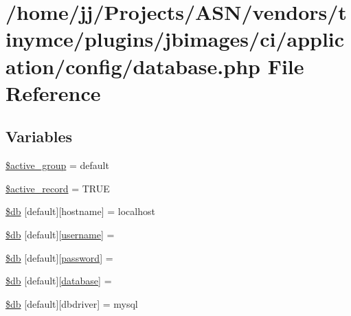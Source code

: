 \hypertarget{database_8php}{}\section{/home/jj/\+Projects/\+A\+S\+N/vendors/tinymce/plugins/jbimages/ci/application/config/database.php File Reference}
\label{database_8php}
\subsection*{Variables}
\begin{DoxyCompactItemize}
\item 
\hyperlink{database_8php_a5046ea83a698c5b7bbf6ffd3dd816b65}{\$active\+\_\+group} = \textquotesingle{}default\textquotesingle{}
\item 
\hyperlink{database_8php_a228b6ea91602f48a8831d0dc94809b94}{\$active\+\_\+record} = T\+R\+UE
\item 
\hyperlink{database_8php_a987b8cb0ae83b9519cb7c36fe25dbdd8}{\$db} \mbox{[}\textquotesingle{}default\textquotesingle{}\mbox{]}\mbox{[}\textquotesingle{}hostname\textquotesingle{}\mbox{]} = \textquotesingle{}localhost\textquotesingle{}
\item 
\hyperlink{database_8php_a2f535f16fa00521992cfc791c8dcec37}{\$db} \mbox{[}\textquotesingle{}default\textquotesingle{}\mbox{]}\mbox{[}\textquotesingle{}\hyperlink{actions_2account_8php_ac9b3768ccc688c2ff0811c50c107a02e}{username}\textquotesingle{}\mbox{]} = \textquotesingle{}\textquotesingle{}
\item 
\hyperlink{database_8php_a1f6afce218438d9f7d13e28ee602e29b}{\$db} \mbox{[}\textquotesingle{}default\textquotesingle{}\mbox{]}\mbox{[}\textquotesingle{}\hyperlink{actions_2account_8php_a3ef39d3ee8b2bcca6a288308549ccb44}{password}\textquotesingle{}\mbox{]} = \textquotesingle{}\textquotesingle{}
\item 
\hyperlink{database_8php_a87e73e2a5365d1ee95a673b551238fef}{\$db} \mbox{[}\textquotesingle{}default\textquotesingle{}\mbox{]}\mbox{[}\textquotesingle{}\hyperlink{ossn_8config_8db_8example_8php_a4e0ca996705612048240f76ff8d4da95}{database}\textquotesingle{}\mbox{]} = \textquotesingle{}\textquotesingle{}
\item 
\hyperlink{database_8php_a9f97429a3096d60fa26291b35f6cb7a9}{\$db} \mbox{[}\textquotesingle{}default\textquotesingle{}\mbox{]}\mbox{[}\textquotesingle{}dbdriver\textquotesingle{}\mbox{]} = \textquotesingle{}mysql\textquotesingle{}

\end{DoxyCompactItemize}
